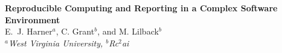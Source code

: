 
\setlength{\textwidth}{160mm}\setlength{\textheight}{240mm}
\setlength{\oddsidemargin}{0mm}\setlength{\evensidemargin}{0mm}
\setlength{\topmargin}{-10mm}
\setlength{\parindent}{0mm} 
\pagestyle{empty}	%



{\Large\bf Reproducible Computing and Reporting in a Complex Software Environment}\\[4mm]

E.~J. Harner$^a$, C. Grant$^b$, and  M. Lilback$^b$\\ 				

{\small \em $^a$West Virginia University, $^b$Rc$^2$ai}\\[3mm]


